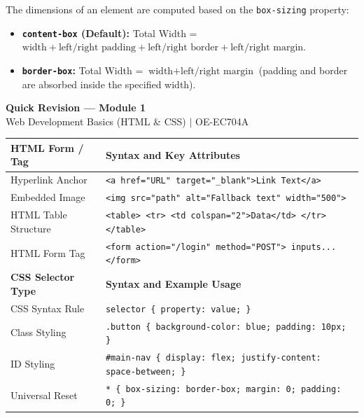 \documentclass[12pt,a4paper]{article}
\renewcommand{\arraystretch}{1.45}
\begin{document}
The dimensions of an element are computed based on the \texttt{box-sizing} property:
\begin{itemize}[leftmargin=*, itemsep=3pt]
  \item \textbf{\texttt{content-box} (Default):} Total Width = $\text{width} + \text{left/right padding} + \text{left/right border} + \text{left/right margin}$.
  \item \textbf{\texttt{border-box}:} Total Width = $\text{width} + \text{left/right margin}$ (padding and border are absorbed inside the specified width).
\end{itemize}

\newpage
\begin{center}
  {\large\bfseries\color{myred} Quick Revision --- Module 1}\\[3pt]
  {\small\color{mydark} Web Development Basics (HTML \& CSS) $|$ OE-EC704A}
\end{center}
\noindent{\color{myred}\rule{\linewidth}{1.2pt}}
\vspace{4pt}

\begin{tcolorbox}[formulabox, title={\textbf{Core HTML Tags \& CSS Syntax}}]
{\renewcommand{\arraystretch}{1.3}%
\begin{tabularx}{\linewidth}{l Y}
\textbf{HTML Form / Tag} & \textbf{Syntax and Key Attributes} \\
\hline
Hyperlink Anchor & \texttt{<a href="URL" target="\_blank">Link Text</a>} \\
Embedded Image & \texttt{<img src="path" alt="Fallback text" width="500">} \\
HTML Table Structure & \texttt{<table> <tr> <td colspan="2">Data</td> </tr> </table>} \\
HTML Form Tag & \texttt{<form action="/login" method="POST"> inputs... </form>} \\
\hline
\textbf{CSS Selector Type} & \textbf{Syntax and Example Usage} \\
\hline
CSS Syntax Rule & \texttt{selector \{ property: value; \}} \\
Class Styling & \texttt{.button \{ background-color: blue; padding: 10px; \}} \\
ID Styling & \texttt{\#main-nav \{ display: flex; justify-content: space-between; \}} \\
Universal Reset & \texttt{* \{ box-sizing: border-box; margin: 0; padding: 0; \}} \\
\end{tabularx}}
\end{tcolorbox}
\end{document}
